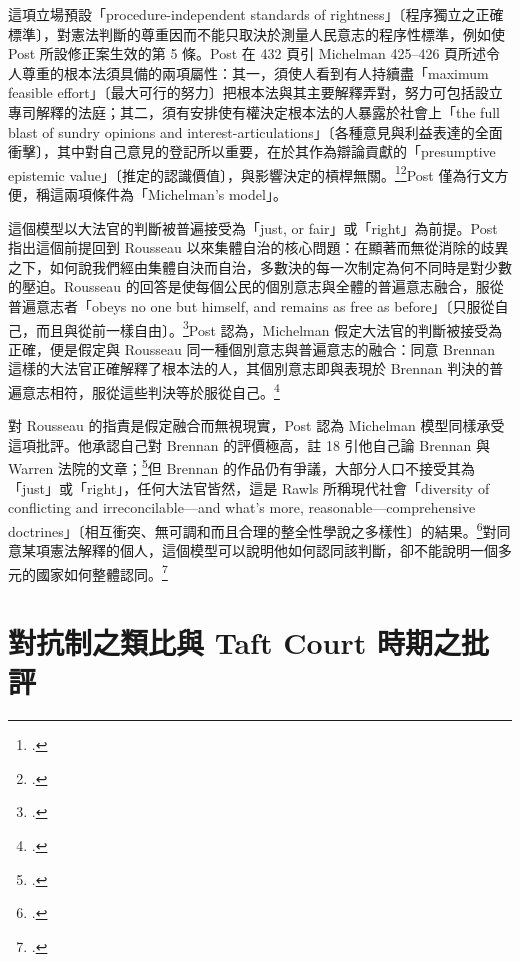 這項立場預設「procedure-independent standards of rightness」〔程序獨立之正確標準〕，對憲法判斷的尊重因而不能只取決於測量人民意志的程序性標準，例如使 Post 所設修正案生效的第 5 條。Post 在 432 頁引 Michelman 425--426 頁所述令人尊重的根本法須具備的兩項屬性：其一，須使人看到有人持續盡「maximum feasible effort」〔最大可行的努力〕把根本法與其主要解釋弄對，努力可包括設立專司解釋的法庭；其二，須有安排使有權決定根本法的人暴露於社會上「the full blast of sundry opinions and interest-articulations」〔各種意見與利益表達的全面衝擊〕，其中對自己意見的登記所以重要，在於其作為辯論貢獻的「presumptive epistemic value」〔推定的認識價值〕，與影響決定的槓桿無關。\footcite[432]{post1998}\footcite[425--426]{michelman1998}Post 僅為行文方便，稱這兩項條件為「Michelman's model」。

這個模型以大法官的判斷被普遍接受為「just, or fair」或「right」為前提。Post 指出這個前提回到 Rousseau 以來集體自治的核心問題：在顯著而無從消除的歧異之下，如何說我們經由集體自決而自治，多數決的每一次制定為何不同時是對少數的壓迫。Rousseau 的回答是使每個公民的個別意志與全體的普遍意志融合，服從普遍意志者「obeys no one but himself, and remains as free as before」〔只服從自己，而且與從前一樣自由〕。\footcite[433 \& nn.15--16]{post1998}Post 認為，Michelman 假定大法官的判斷被接受為正確，便是假定與 Rousseau 同一種個別意志與普遍意志的融合：同意 Brennan 這樣的大法官正確解釋了根本法的人，其個別意志即與表現於 Brennan 判決的普遍意志相符，服從這些判決等於服從自己。\footcite[433 \& n.17]{post1998}

對 Rousseau 的指責是假定融合而無視現實，Post 認為 Michelman 模型同樣承受這項批評。他承認自己對 Brennan 的評價極高，註 18 引他自己論 Brennan 與 Warren 法院的文章；\footcite[433 n.18]{post1998}但 Brennan 的作品仍有爭議，大部分人口不接受其為「just」或「right」，任何大法官皆然，這是 Rawls 所稱現代社會「diversity of conflicting and irreconcilable---and what's more, reasonable---comprehensive doctrines」〔相互衝突、無可調和而且合理的整全性學說之多樣性〕的結果。\footcite[433 \& n.19]{post1998}對同意某項憲法解釋的個人，這個模型可以說明他如何認同該判斷，卻不能說明一個多元的國家如何整體認同。\footcite[433--434]{post1998}

\section{對抗制之類比與 Taft Court 時期之批評}
\label{sec:60_post-3}


